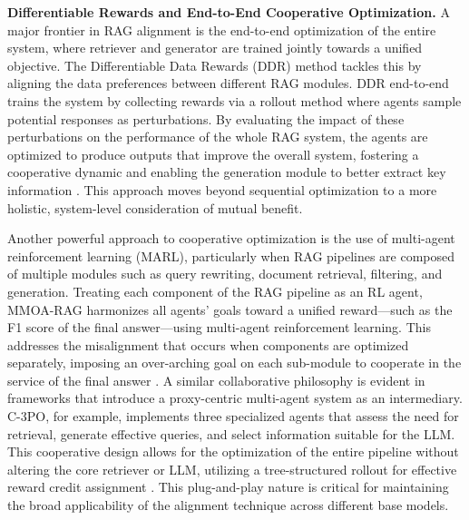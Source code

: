 \documentclass[11pt]{article}
\begin{document}
\textbf{Differentiable Rewards and End-to-End Cooperative Optimization.} A major frontier in RAG alignment is the end-to-end optimization of the entire system, where retriever and generator are trained jointly towards a unified objective. The Differentiable Data Rewards (DDR) method tackles this by aligning the data preferences between different RAG modules. DDR end-to-end trains the system by collecting rewards via a rollout method where agents sample potential responses as perturbations. By evaluating the impact of these perturbations on the performance of the whole RAG system, the agents are optimized to produce outputs that improve the overall system, fostering a cooperative dynamic and enabling the generation module to better extract key information \cite{ref20}. This approach moves beyond sequential optimization to a more holistic, system-level consideration of mutual benefit.

Another powerful approach to cooperative optimization is the use of multi-agent reinforcement learning (MARL), particularly when RAG pipelines are composed of multiple modules such as query rewriting, document retrieval, filtering, and generation. Treating each component of the RAG pipeline as an RL agent, MMOA-RAG harmonizes all agents' goals toward a unified reward---such as the F1 score of the final answer---using multi-agent reinforcement learning. This addresses the misalignment that occurs when components are optimized separately, imposing an over-arching goal on each sub-module to cooperate in the service of the final answer \cite{ref279}. A similar collaborative philosophy is evident in frameworks that introduce a proxy-centric multi-agent system as an intermediary. C-3PO, for example, implements three specialized agents that assess the need for retrieval, generate effective queries, and select information suitable for the LLM. This cooperative design allows for the optimization of the entire pipeline without altering the core retriever or LLM, utilizing a tree-structured rollout for effective reward credit assignment \cite{ref280}. This plug-and-play nature is critical for maintaining the broad applicability of the alignment technique across different base models.
\end{document}
